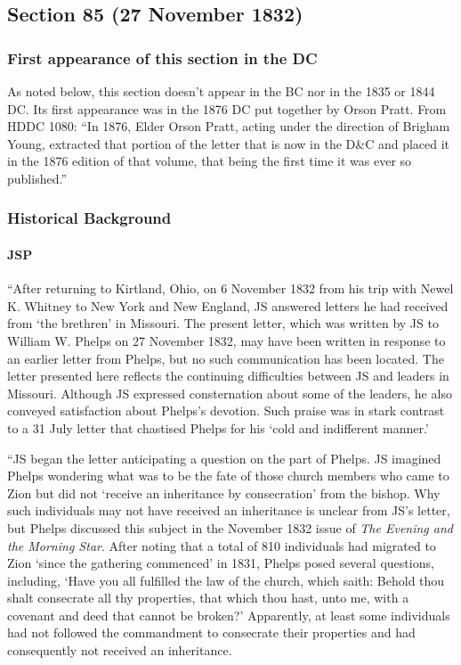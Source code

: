 \subsection{Section 85 (27 November 1832)}
	\label{DC85}
	
	\subsubsection{First appearance of this section in the DC}
	
		As noted below, this section doesn't appear in the BC nor in the 1835 or 1844 DC. Its first appearance was in the 1876 DC put together by Orson Pratt. From HDDC 1080: ``In 1876, Elder Orson Pratt, acting under the direction of Brigham Young, extracted that portion of the letter that is now in the D\&C and placed it in the 1876 edition of that volume, that being the first time it was ever so published.''
	
	\subsubsection{Historical Background}
		\label{DC85-HB}
		
		\paragraph{JSP}
		
			``After returning to Kirtland, Ohio, on 6 November 1832 from his trip with Newel K. Whitney to New York and New England, JS answered letters he had received from `the brethren' in Missouri. The present letter, which was written by JS to William W. Phelps on 27 November 1832, may have been written in response to an earlier letter from Phelps, but no such communication has been located. The letter presented here reflects the continuing difficulties between JS and leaders in Missouri. Although JS expressed consternation about some of the leaders, he also conveyed satisfaction about Phelps's devotion. Such praise was in stark contrast to a 31 July letter that chastised Phelps for his `cold and indifferent manner.'

			``JS began the letter anticipating a question on the part of Phelps. JS imagined Phelps wondering what was to be the fate of those church members who came to Zion but did not `receive an inheritance by consecration' from the bishop. Why such individuals may not have received an inheritance is unclear from JS's letter, but Phelps discussed this subject in the November 1832 issue of \textit{The Evening and the Morning Star}. After noting that a total of 810 individuals had migrated to Zion `since the gathering commenced' in 1831, Phelps posed several questions, including, `Have you all fulfilled the law of the church, which saith: Behold thou shalt consecrate all thy properties, that which thou hast, unto me, with a covenant and deed that cannot be broken?' Apparently, at least some individuals had not followed the commandment to consecrate their properties and had consequently not received an inheritance.

